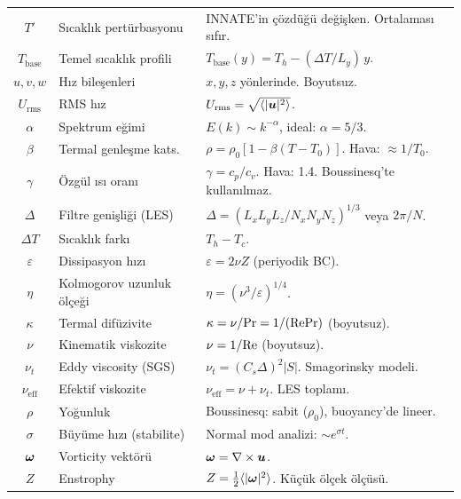 \begin{table}[H]
\begin{tabular}{clp{8.5cm}}
$T'$        & Sıcaklık pertürbasyonu & INNATE'in çözdüğü değişken. Ortalaması sıfır. \\
$T_{\text{base}}$ & Temel sıcaklık profili & $T_{\text{base}}(y) = T_h - (\Delta T/L_y)\,y$. \\
$u, v, w$   & Hız bileşenleri     & $x, y, z$ yönlerinde. Boyutsuz. \\
$U_{\text{rms}}$ & RMS hız            & $U_{\text{rms}} = \sqrt{\langle |\bm{u}|^2 \rangle}$. \\
\midrule
$\alpha$    & Spektrum eğimi       & $E(k) \sim k^{-\alpha}$, ideal: $\alpha = 5/3$. \\
$\beta$     & Termal genleşme kats. & $\rho = \rho_0[1 - \beta(T - T_0)]$. Hava: $\approx 1/T_0$. \\
$\gamma$    & Özgül ısı oranı & $\gamma = c_p/c_v$. Hava: 1.4. Boussinesq'te kullanılmaz. \\
$\Delta$    & Filtre genişliği (LES) & $\Delta = (L_x L_y L_z / N_x N_y N_z)^{1/3}$ veya $2\pi/N$. \\
$\Delta T$  & Sıcaklık farkı     & $T_h - T_c$. \\
$\varepsilon$ & Dissipasyon hızı   & $\varepsilon = 2\nu Z$ (periyodik BC). \\
$\eta$      & Kolmogorov uzunluk ölçeği & $\eta = (\nu^3/\varepsilon)^{1/4}$. \\
$\kappa$    & Termal difüzivite    & $\kappa = \nu/\mathrm{Pr} = 1/(\mathrm{Re}\mathrm{Pr})$ (boyutsuz). \\
$\nu$       & Kinematik viskozite     & $\nu = 1/\mathrm{Re}$ (boyutsuz). \\
$\nu_t$     & Eddy viscosity (SGS)    & $\nu_t = (C_s\Delta)^2 |S|$. Smagorinsky modeli. \\
$\nu_{\text{eff}}$ & Efektif viskozite & $\nu_{\text{eff}} = \nu + \nu_t$. LES toplamı. \\
$\rho$      & Yoğunluk             & Boussinesq: sabit ($\rho_0$), buoyancy'de lineer. \\
$\sigma$    & Büyüme hızı (stabilite) & Normal mod analizi: $\sim e^{\sigma t}$. \\
$\bm{\omega}$ & Vorticity vektörü & $\bm{\omega} = \nabla \times \bm{u}$. \\
$Z$         & Enstrophy               & $Z = \frac{1}{2}\langle |\bm{\omega}|^2 \rangle$. Küçük ölçek ölçüsü. \\
\bottomrule
\end{tabular}
\end{table}


